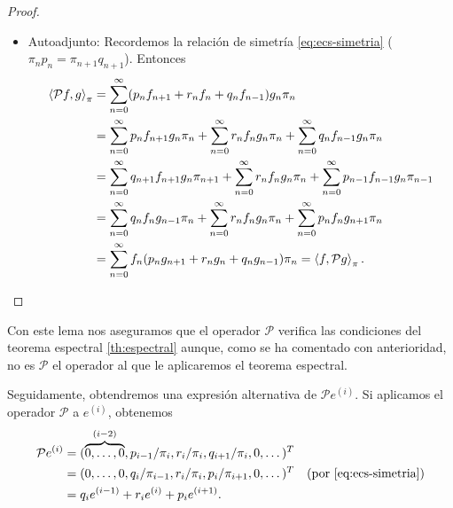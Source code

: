 \begin{proof}
\begin{itemize}
            \item Autoadjunto: Recordemos la relación de simetría \eqref{eq:ecs-simetria} ($\pi_n p_n = \pi_{n+1}q_{n+1}$). Entonces
            \begin{equation*}
                \begin{split}
                    \left\langle \mathcal P f , g \right\rangle_\pi&=\sum_{n=0}^\infty(p_n f_{n+1} + r_n f_n + q_n f_{n-1})g_n\pi_n\\
                    &= \sum_{n=0}^\infty p_n f_{n+1}g_n\pi_n + \sum_{n=0}^\infty r_n f_{n}g_n\pi_n + \sum_{n=0}^\infty q_n f_{n-1}g_n\pi_n \\
                    &= \sum_{n=0}^\infty q_{n+1} f_{n+1}g_n\pi_{n+1} + \sum_{n=0}^\infty r_n f_{n}g_n\pi_n + \sum_{n=0}^\infty p_{n-1} f_{n-1}g_n\pi_{n-1} \\
                    &= \sum_{n=0}^\infty q_{n} f_{n}g_{n-1}\pi_{n} + \sum_{n=0}^\infty r_n f_{n}g_n\pi_n + \sum_{n=0}^\infty p_{n} f_{n}g_{n+1}\pi_{n} \\
                    &= \sum_{n=0}^\infty f_n(p_n g_{n+1} + r_n g_n+ q_n g_{n-1})\pi_n = \left\langle f , \mathcal{P}g \right\rangle_\pi.
                \end{split}  
            \end{equation*}

        \end{itemize}

    \end{proof}

    Con este lema nos aseguramos que el operador $\mathcal{P}$ verifica las condiciones del teorema espectral \ref{th:espectral} aunque, como se ha comentado con anterioridad, no es $\mathcal{P}$ el operador al que le aplicaremos el teorema espectral. 

    Seguidamente, obtendremos una expresión alternativa de $\mathcal{P}e^{(i)}$. Si aplicamos el operador $\mathcal{P}$ a $e^{(i)}$, obtenemos
    \begin{equation*}
        \begin{split}
            \mathcal{P}e^{(i)} &= (\overbrace{0,\dots,0}^{(i-2)}, p_{i-1}/\pi_i, r_i/\pi_i, q_{i+1}/\pi_i,0,\dots)^T \\
            &= (0,\dots,0, q_i/\pi_{i-1},  r_i/\pi_i, p_i/\pi_{i+1},0,\dots)^T \ \ \ \text{(por \eqref{eq:ecs-simetria})}\\
            &= q_i e^{(i-1)} + r_i e^{(i)} + p_i e^{(i+1)}.
        \end{split}
    \end{equation*}

